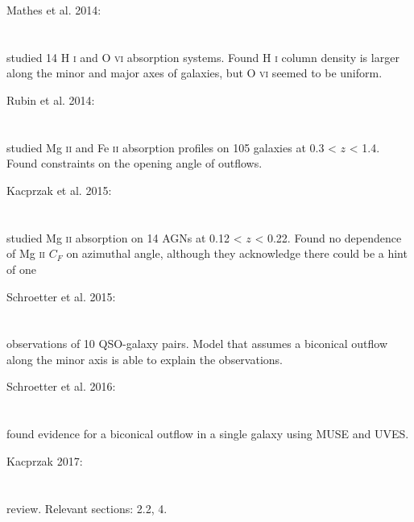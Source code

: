 \hline

Mathes et al. 2014: \\
\citet{2014ApJ...792..128M} \\
\citep{2014ApJ...792..128M} \\
studied 14 H \textsc{i} and O \textsc{vi} absorption systems. Found
H \textsc{i} column density is larger along the minor and major axes of
galaxies, but O \textsc{vi} seemed to be uniform. \\

\hline

Rubin et al. 2014: \\
\citet{2014ApJ...794..156R} \\
\citep{2014ApJ...794..156R} \\
studied Mg \textsc{ii} and Fe \textsc{ii} absorption profiles on 105 galaxies at
0.3 < $z$ < 1.4. Found constraints on the opening angle of outflows. \\

\hline

Kacprzak et al. 2015: \\
\citet{2015MNRAS.446.2861K} \\
\citep{2015MNRAS.446.2861K} \\
studied Mg \textsc{ii} absorption on 14 AGNs at 0.12 < $z$ < 0.22. Found no
dependence of Mg \textsc{ii} $C_{F}$ on azimuthal angle, although they
acknowledge there could be a hint of one\\

\hline

Schroetter et al. 2015: \\
\citet{2015ApJ...804...83S} \\
\citep{2015ApJ...804...83S} \\
observations of 10 QSO-galaxy pairs. Model that assumes a biconical outflow
along the minor axis is able to explain the observations. \\

\hline

Schroetter et al. 2016: \\
\citet{2016ApJ...833...39S} \\
\citep{2016ApJ...833...39S} \\
found evidence for a biconical outflow in a single galaxy using MUSE and
UVES. \\

\hline

Kacprzak 2017: \\
\citet{2017ASSL..430..145K} \\
\citep{2017ASSL..430..145K} \\
review. Relevant sections: 2.2, 4. \\

